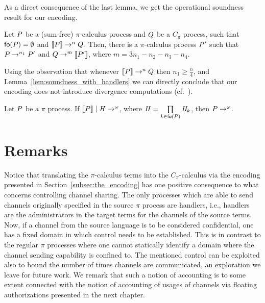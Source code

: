 As a direct consequence of the last lemma, we get the operational soundness result for our encoding.

\begin{corollary}\label{cor:op_corresp_soundness}
Let $P$ be a (sum-free) $\pi$-calculus process and $Q$ be a $C_\pi$ process, such that $\mathsf{fo}(P)=\emptyset$ and $\llbracket P \rrbracket \rightarrow^n Q$.
Then, there is a $\pi$-calculus process $P'$ such that $P\rightarrow^{n_1} P'$ and $Q\rightarrow^m \llbracket P' \rrbracket$, where $m=3n_1-n_2-n_3-n_4$. 
\end{corollary}

Using the observation that whenever $\llbracket P \rrbracket\rightarrow^nQ$ then $n_1\geq \frac{n}{4}$, and Lemma~\ref{lem:soundness_with_handlers} we can directly conclude that our encoding does not introduce divergence computations (cf.~\cite{DBLP:journals/iandc/Gorla10}).
 
\begin{corollary}
Let $P$ be a $\pi$ process. 
If $\llbracket P \rrbracket \;|\; \mathit{H}\rightarrow^\omega$, where $\mathit{H}=\prod\limits_{k\in\mathsf{fo}(P)} \mathit{H}_{k}$, then $P\rightarrow^\omega$.
\end{corollary}

\section{Remarks}\label{subsec:Cpi-remarks}

Notice that translating the $\pi$-calculus terms into the $C_\pi$-calculus via the encoding presented in Section~\ref{subsec:the_encoding} has one positive consequence to what concerns controlling channel sharing. The only processes which are able to send channels originally specified in the source $\pi$ process are handlers, i.e., handlers are the administrators in the target terms for the channels of the source terms. 
Now, if a channel from the source language is to be considered confidential, one has a fixed domain in which control needs to be established. This is in contrast to the regular $\pi$ processes where one cannot statically identify a domain where the channel sending capability is confined to. 
The mentioned control can be exploited also to bound the number of times channels are communicated, an exploration we leave for future work. We remark that such a notion of accounting is to some extent connected with the notion of accounting of usages of channels via floating authorizations presented in the next chapter.